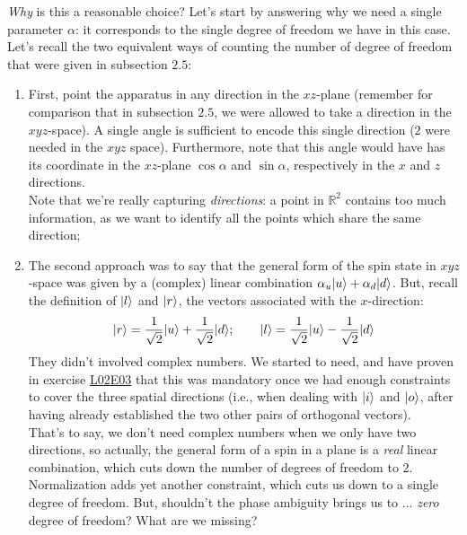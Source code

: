 \documentclass[solutions.tex]{subfiles}
\begin{document}
\textit{Why} is this a reasonable choice? Let's start by answering
why we need a single parameter $\alpha$: it corresponds to the single
degree of freedom we have in this case. Let's recall the two equivalent
ways of counting the number of degree of freedom that were given
in subsection $2.5$:

\begin{enumerate}
	\item First, point the apparatus in any direction in the $xz$-plane
	(remember for comparison that in subsection $2.5$, we were allowed
	to take a direction in the $xyz$-space). A single angle is sufficient
	to encode this single direction ($2$ were needed in the $xyz$ space).
	Furthermore, note that this angle would have has its coordinate in
	the $xz$-plane $\cos\alpha$ and $\sin\alpha$, respectively in the
	$x$ and $z$ directions. \\

	Note that we're really capturing \textit{directions}: a point
	in $\mathbb{R}^2$ contains too much information, as we want
	to identify all the points which share the same direction;
	\item The second approach was to say that the general form of the
	spin state in $xyz$-space was given by a (complex) linear combination
	$\alpha_u|u\rangle+\alpha_d|d\rangle$. But, recall the definition
	of $|l\rangle$ and $|r\rangle$, the vectors associated with the $x$-direction:
	\[
		|r\rangle = \frac1{\sqrt2}|u\rangle + \frac1{\sqrt2}|d\rangle;\qquad
		|l\rangle = \frac1{\sqrt2}|u\rangle - \frac1{\sqrt2}|d\rangle
	\]
	They didn't involved complex numbers. We started to need, and have
	proven in exercise
	\href{https://github.com/mbivert/ttm/blob/master/qm/L02E03.pdf}{L02E03}
	that this was mandatory once we had
	enough constraints to cover the three spatial directions (i.e.,
	when dealing with $|i\rangle$ and $|o\rangle$, after having already
	established the two other pairs of orthogonal vectors). \\

	That's to say, we don't need complex numbers when we only have
	two directions, so actually, the general form of a spin
	in a plane is a \textit{real} linear combination, which cuts
	down the number of degrees of freedom to $2$. \\

	Normalization adds yet another constraint, which cuts us down
	to a single degree of freedom. But, shouldn't the phase
	ambiguity brings us to $\ldots$ \textit{zero} degree of freedom?
	What are we missing? \\


\end{enumerate}
\end{document}
